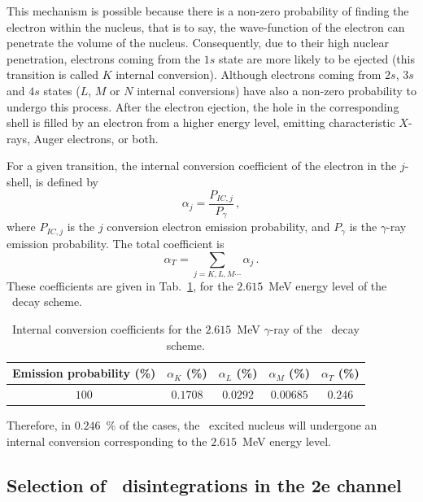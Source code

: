 This mechanism is possible because there is a non-zero probability of finding the electron within the nucleus, that is to say, the wave-function of the electron can penetrate the volume of the nucleus.
Consequently, due to their high nuclear penetration, electrons coming from the $1s$ state are more likely to be ejected (this transition is called $K$ internal conversion).
Although electrons coming from $2s$, $3s$ and $4s$ states ($L$, $M$ or $N$ internal conversions) have also a non-zero probability to undergo this process.
After the electron ejection, the hole in the corresponding shell is filled by an electron from a higher energy level, emitting characteristic $X$-rays, Auger electrons, or both.

For a given transition, the internal conversion coefficient of the electron in the $j$-shell, is defined by
\begin{equation}
\alpha_{j}=\frac{P_{IC, j}}{P_{\gamma}}\,,
\end{equation}
where $P_{IC,j}$ is the $j$ conversion electron emission probability, and $P_{\gamma}$ is the $\gamma$-ray emission probability.
The total coefficient is
\begin{equation}
  \alpha_{T}=\sum_{j=K,L,M\cdots}\alpha_{j}\,.
\end{equation}
These coefficients are given in Tab.~\ref{tab:IC_prob}, for the $2.615$~MeV energy level of the \Tl\ decay scheme.
\begin{table}[!h]
  \centering
  \begin{tabular}{|c|c|c|c|c|}
    \hline
    Emission probability (\%) & $\alpha_{K}$ (\%) & $\alpha_{L}$ (\%) & $\alpha_{M}$ (\%) & $\alpha_{T}$ (\%) \\
    \hline\hline
    $100$ & $0.1708$ &    $0.0292$ &  $0.00685$  &    $0.246$ \\
    \hline
  \end{tabular}
  \caption{Internal conversion coefficients for the $2.615$~MeV $\gamma$-ray of the \Tl\ decay scheme.
    \label{tab:IC_prob}}
\end{table}
Therefore, in $0.246$~\% of the cases, the \Pb\ excited nucleus will undergone an internal conversion corresponding to the $2.615$~MeV energy level.


\subsection{Selection of \Tl\ disintegrations in the 2e channel}

